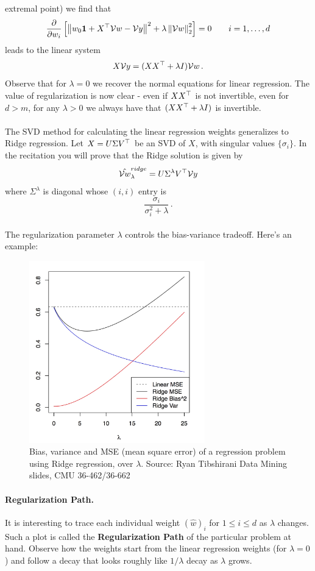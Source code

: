 extremal point) we find that 
  \[
    \frac{\partial}
    {\partial w_i}
    \left[
    \left\|  w_0\mathbf{1} + X^{\top}\mathcal{V}{w} -\mathcal{V}{y}  \right\|^2
  +  \lambda \left\| \mathcal{V}{w}\right\|^2_2 \right]=0 \qquad i=1,\ldots,d
  \]
leads to the linear system
\[
  X\mathcal{V}{y} = (XX^{\top}+\lambda I)\mathcal{V}{w} \,.
\]
Observe that for $\lambda=0$ we recover the normal equations for linear
regression. The value of regularization is now clear - even if $XX^{\top}$ is not
invertible, even for $d>m$, for any $\lambda>0$ we always have that
$(XX^{\top}+\lambda I)$ is invertible. 
\\~\\
The SVD method for calculating the linear regression weights generalizes to
Ridge regression. Let $X=U\Sigma V^{\top}$ be an SVD of $X$, with singular values
$\{\sigma_i\}$. In the recitation you will prove that  the Ridge solution is
given by 
\[
  \hat{\mathcal{V}{w}}_\lambda^{ridge} = U \Sigma^\lambda V^{\top}\mathcal{V}{y}
\]
where $\Sigma^\lambda$ is diagonal whose $(i,i)$ entry is 
\[
  \frac{\sigma_i}{\sigma_i^2+\lambda}\,.
\]
~\\
The regularization parameter $\lambda$ controls the bias-variance tradeoff.
Here's an example: 

\begin{figure}[H]
      \centering
      \includegraphics[width=3in]{ridge_bias_variance.jpeg}
      \caption{Bias, variance and MSE (mean square error) of a regression
      problem using Ridge regression, over $\lambda$. Source: Ryan Tibshirani Data Mining slides, CMU 36-462/36-662 }
    \end{figure}

\paragraph{Regularization Path.}
It is interesting to trace each individual weight $(\hat{w})_i$ for $1\leq i\leq
d$ as $\lambda$ changes. Such a plot is called the {\bf Regularization Path} of
the particular problem at hand. Observe how the weights start from the linear
regression weights (for $\lambda=0$) and follow a decay that looks roughly like
$1/\lambda$ decay as $\lambda$
grows. 

